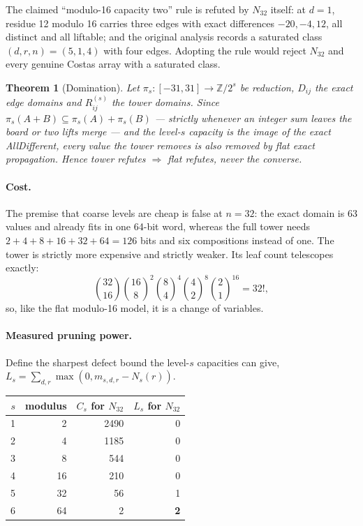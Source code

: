 \documentclass[11pt,a4paper]{article}
\newtheorem{theorem}{Theorem}[section]
\theoremstyle{definition}
\newcommand{\Z}{\mathbb{Z}}
\begin{document}
The claimed ``modulo-16 capacity two'' rule is refuted by $N_{32}$ itself: at
$d=1$, residue 12 modulo 16 carries three edges with exact differences
$-20,-4,12$, all distinct and all liftable; and the original analysis records a
saturated class $(d,r,n)=(5,1,4)$ with four edges. Adopting the rule would reject
$N_{32}$ and every genuine Costas array with a saturated class.

\begin{theorem}[Domination]
\label{thm:domination}
Let $\pi_s:[-31,31]\to\Z/2^s$ be reduction, $D_{ij}$ the exact edge domains and
$R^{(s)}_{ij}$ the tower domains. Since $\pi_s(A+B)\subseteq\pi_s(A)+\pi_s(B)$
--- strictly whenever an integer sum leaves the board or two lifts merge --- and
the level-$s$ capacity is the image of the exact AllDifferent, every value the
tower removes is also removed by flat exact propagation. Hence tower refutes
$\Rightarrow$ flat refutes, never the converse.
\end{theorem}

\paragraph{Cost.} The premise that coarse levels are cheap is false at $n=32$:
the exact domain is 63 values and already fits in one 64-bit word, whereas the
full tower needs $2+4+8+16+32+64=126$ bits and six compositions instead of one.
The tower is strictly more expensive and strictly weaker. Its leaf count
telescopes exactly:
\[
\binom{32}{16}\binom{16}{8}^2\binom{8}{4}^4\binom{4}{2}^8\binom{2}{1}^{16}
= 32!,
\]
so, like the flat modulo-16 model, it is a change of variables.

\paragraph{Measured pruning power.} Define the sharpest defect bound the
level-$s$ capacities can give, $L_s=\sum_{d,r}\max(0, m_{s,d,r}-N_s(r))$.

\begin{center}
\begin{tabular}{@{}rrrr@{}}
\toprule
$s$ & modulus & $C_s$ for $N_{32}$ & $L_s$ for $N_{32}$ \\
\midrule
1 & 2 & 2490 & 0 \\
2 & 4 & 1185 & 0 \\
3 & 8 & 544 & 0 \\
4 & 16 & 210 & 0 \\
5 & 32 & 56 & 1 \\
6 & 64 & 2 & \textbf{2} \\
\bottomrule
\end{tabular}
\end{center}
\end{document}
